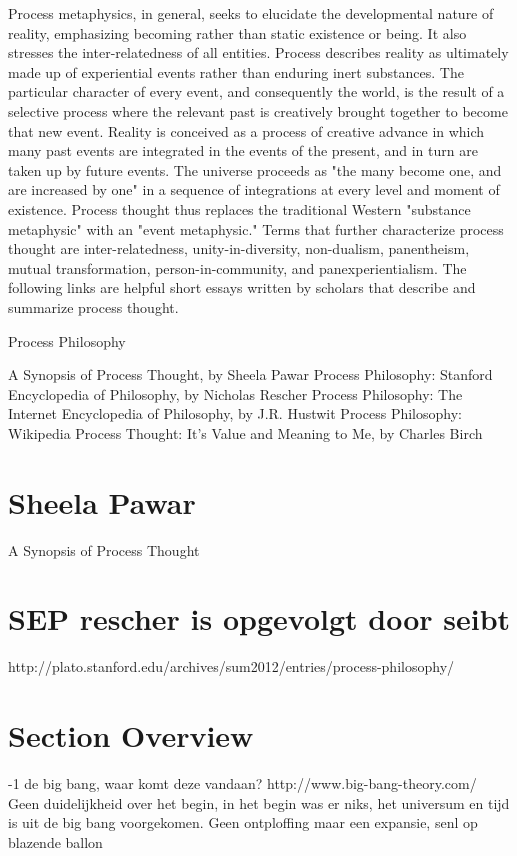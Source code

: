 \documentclass[a4paper]{Thesis}
\begin{document}
Process metaphysics, in general, seeks to elucidate the developmental nature of reality, emphasizing becoming rather than static existence or being. It also stresses the inter-relatedness of all entities. Process describes reality as ultimately made up of experiential events rather than enduring inert substances. The particular character of every event, and consequently the world, is the result of a selective process where the relevant past is creatively brought together to become that new event. Reality is conceived as a process of creative advance in which many past events are integrated in the events of the present, and in turn are taken up by future events. The universe proceeds as "the many become one, and are increased by one" in a sequence of integrations at every level and moment of existence. Process thought thus replaces the traditional Western "substance metaphysic" with an "event metaphysic." Terms that further characterize process thought are inter-relatedness, unity-in-diversity, non-dualism, panentheism, mutual transformation, person-in-community, and panexperientialism. The following links are helpful short essays written by scholars that describe and summarize process thought.

Process Philosophy

A Synopsis of Process Thought, by Sheela Pawar
Process Philosophy: Stanford Encyclopedia of Philosophy, by Nicholas Rescher
Process Philosophy: The Internet Encyclopedia of Philosophy, by J.R. Hustwit
Process Philosophy: Wikipedia
Process Thought: It's Value and Meaning to Me, by Charles Birch


\section{Sheela Pawar}
A Synopsis of Process Thought


\section{SEP rescher is opgevolgt door seibt}
http://plato.stanford.edu/archives/sum2012/entries/process-philosophy/

\section{Section Overview}

-1 de big bang, waar komt deze vandaan?
http://www.big-bang-theory.com/
Geen duidelijkheid over het begin, in het begin was er niks, het universum en tijd is uit de big bang voorgekomen.
Geen ontploffing maar een expansie, senl op blazende ballon
\end{document}
